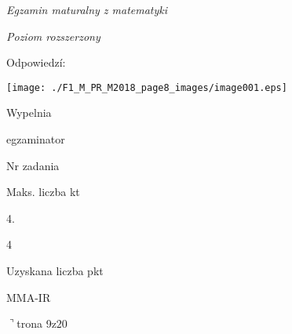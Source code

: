 \documentclass[a4paper,12pt]{article}
\begin{document}
{\it Egzamin maturalny z matematyki}

{\it Poziom rozszerzony}

Odpowiedzí:
\begin{center}
\texttt{[image: ./F1\_M\_PR\_M2018\_page8\_images/image001.eps]}
\end{center}
Wypelnia

egzaminator

Nr zadania

Maks. liczba kt

4.

4

Uzyskana liczba pkt

MMA-IR

$\urcorner$trona 9$\mathrm{z}20$
\end{document}
